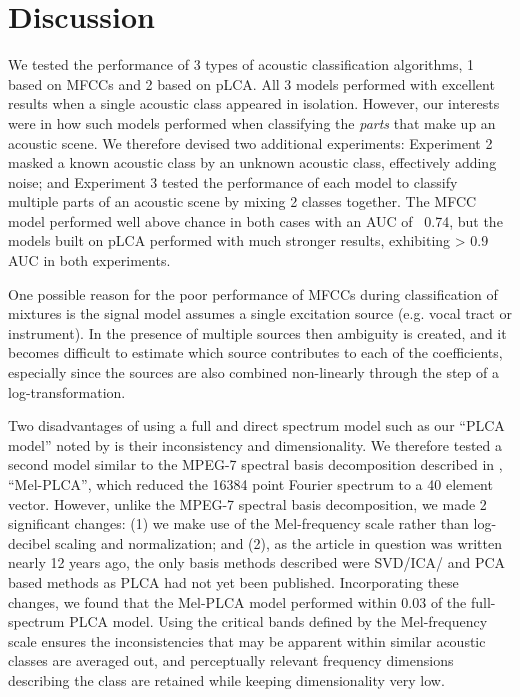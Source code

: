 \documentclass[a4paper,10pt,final]{ThesisStyle}
\begin{document}
\section{Discussion}


We tested the performance of 3 types of acoustic classification algorithms, 1 based on MFCCs and 2 based on pLCA.  All 3 models performed with excellent results when a single acoustic class appeared in isolation.  However, our interests were in how such models performed when classifying the \textit{parts} that make up an acoustic scene.  We therefore devised two additional experiments: Experiment 2 masked a known acoustic class by an unknown acoustic class, effectively adding noise; and Experiment 3 tested the performance of each model to classify multiple parts of an acoustic scene by mixing 2 classes together.  The MFCC model performed well above chance in both cases with an AUC of ~0.74, but the models built on pLCA performed with much stronger results, exhibiting > 0.9 AUC in both experiments.  

One possible reason for the poor performance of MFCCs during classification of mixtures is the signal model assumes a single excitation source (e.g. vocal tract or instrument).  In the presence of multiple sources then ambiguity is created, and it becomes difficult to estimate which source contributes to each of the coefficients, especially since the sources are also combined non-linearly through the step of a log-transformation. 

Two disadvantages of using a full and direct spectrum model such as our ``PLCA model'' noted by \cite{Casey2001a} is their inconsistency and dimensionality.  We therefore tested a second model similar to the MPEG-7 spectral basis decomposition described in  \cite{Casey2001a}, ``Mel-PLCA'', which reduced the 16384 point Fourier spectrum to a 40 element vector.  However, unlike the MPEG-7 spectral basis decomposition, we made 2 significant changes: (1) we make use of the Mel-frequency scale rather than log-decibel scaling and normalization; and (2), as the article in question was written nearly 12 years ago, the only basis methods described were SVD/ICA/ and PCA based methods as PLCA had not yet been published.  Incorporating these changes, we found that the Mel-PLCA model performed within 0.03 of the full-spectrum PLCA model.  Using the critical bands defined by the Mel-frequency scale ensures the inconsistencies that may be apparent within similar acoustic classes are averaged out, and perceptually relevant frequency dimensions describing the class are retained while keeping dimensionality very low.  
\end{document}
